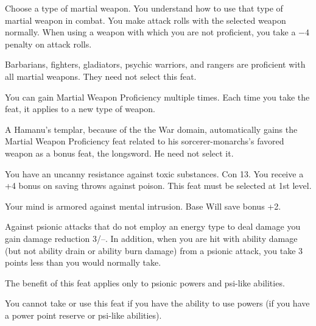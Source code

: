 

{Choose a type of martial weapon. You understand how to use that type of martial weapon in combat.}
{}
{You make attack rolls with the selected weapon normally.}
{When using a weapon with which you are not proficient, you take a $-4$ penalty on attack rolls.}
{Barbarians, fighters, gladiators, psychic warriors, and rangers are proficient with all martial weapons. They need not select this feat.

You can gain Martial Weapon Proficiency multiple times. Each time you take the feat, it applies to a new type of weapon.

A Hamanu's templar, because of the the War domain, automatically gains the Martial Weapon Proficiency feat related to his sorcerer-monarchs's favored weapon as a bonus feat, the longsword. He need not select it.}

{You have an uncanny resistance against toxic substances.}
{Con 13.}
{You receive a +4 bonus on saving throws against poison.}{}
{This feat must be selected at 1st level.}

{Your mind is armored against mental intrusion.}
{Base Will save bonus +2.}
{Against psionic attacks that do not employ an energy type to deal damage you gain damage reduction 3/--. In addition, when you are hit with ability damage (but not ability drain or ability burn damage) from a psionic attack, you take 3 points less than you would normally take.

The benefit of this feat applies only to psionic powers and psi-like abilities. %
}{}
{You cannot take or use this feat if you have the ability to use powers (if you have a power point reserve or psi-like abilities).}

